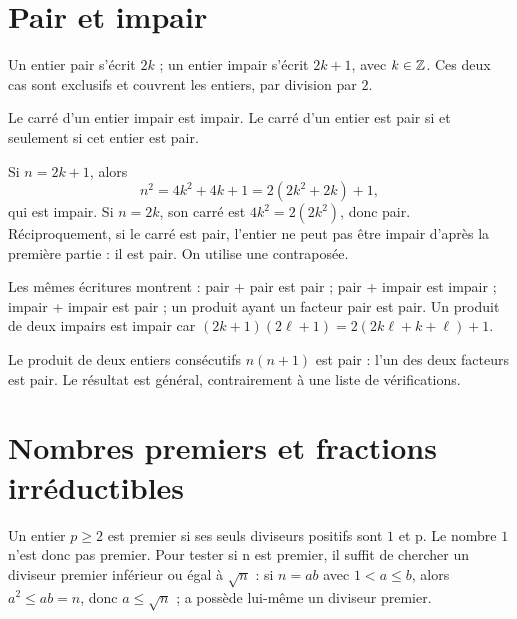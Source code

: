 \documentclass[../cours_2de.tex]{subfiles}
\begin{document}
\section{Pair et impair}
Un entier pair s'écrit $2k$ ; un entier impair s'écrit $2k+1$, avec $k\in\mathbb{Z}$. Ces deux cas sont exclusifs et couvrent les entiers, par division par $2$.
\begin{theoreme}
Le carré d'un entier impair est impair. Le carré d'un entier est pair si et seulement si cet entier est pair.
\end{theoreme}
\begin{demonstration}
Si $n=2k+1$, alors
\[
n^2=4k^2+4k+1=2(2k^2+2k)+1,
\]
qui est impair. Si $n=2k$, son carré est $4k^2=2(2k^2)$, donc pair. Réciproquement, si le carré est pair, l'entier ne peut pas être impair d'après la première partie : il est pair. On utilise une contraposée.
\end{demonstration}
Les mêmes écritures montrent : pair + pair est pair ; pair + impair est impair ; impair + impair est pair ; un produit ayant un facteur pair est pair. Un produit de deux impairs est impair car $(2k+1)(2\ell+1)=2(2k\ell+k+\ell)+1$.

\begin{exemple}
Le produit de deux entiers consécutifs $n(n+1)$ est pair : l'un des deux facteurs est pair. Le résultat est général, contrairement à une liste de vérifications.
\end{exemple}
\section{Nombres premiers et fractions irréductibles}
Un entier $p\ge2$ est premier si ses seuls diviseurs positifs sont $1$ et p. Le nombre $1$ n'est donc pas premier.
Pour tester si n est premier, il suffit de chercher un diviseur premier inférieur ou égal à $\sqrt n$ : si $n=ab$ avec $1<a\le b$, alors $a^2\le ab=n$, donc $a\le\sqrt n$ ; a possède lui-même un diviseur premier.
\end{document}
